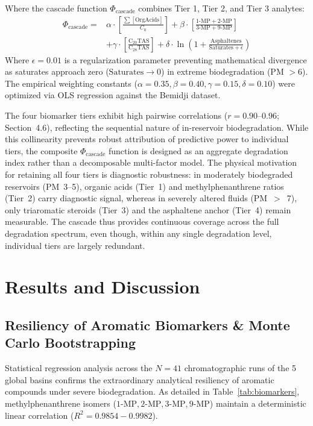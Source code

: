 \documentclass[review,12pt]{elsarticle}
\begin{document}
Where the cascade function $\Phi_{\text{cascade}}$ combines Tier 1, Tier 2, and Tier 3 analytes:
\begin{equation}
\begin{aligned}
    \Phi_{\text{cascade}} = {} & \alpha \cdot \left[ \frac{\sum [\text{OrgAcids}]}{C_0} \right] + \beta \cdot \left[ \frac{1\text{-MP} + 2\text{-MP}}{3\text{-MP} + 9\text{-MP}} \right] \\
    & + \gamma \cdot \left[ \frac{\text{C}_{20}\text{TAS}}{\text{C}_{28}\text{TAS}} \right] + \delta \cdot \ln \left( 1 + \frac{\text{Asphaltenes}}{\text{Saturates} + \epsilon} \right)
\end{aligned}
\end{equation}
Where $\epsilon = 0.01$ is a regularization parameter preventing mathematical divergence as saturates approach zero ($\text{Saturates} \to 0$) in extreme biodegradation (PM $> 6$). The empirical weighting constants ($\alpha = 0.35, \beta = 0.40, \gamma = 0.15, \delta = 0.10$) were optimized via OLS regression against the Bemidji dataset.

The four biomarker tiers exhibit high pairwise correlations ($r = 0.90$--$0.96$; Section~4.6), reflecting the sequential nature of in-reservoir biodegradation. While this collinearity prevents robust attribution of predictive power to individual tiers, the composite $\Phi_{\text{cascade}}$ function is designed as an aggregate degradation index rather than a decomposable multi-factor model. The physical motivation for retaining all four tiers is diagnostic robustness: in moderately biodegraded reservoirs (PM~3--5), organic acids (Tier~1) and methylphenanthrene ratios (Tier~2) carry diagnostic signal, whereas in severely altered fluids (PM~$>$~7), only triaromatic steroids (Tier~3) and the asphaltene anchor (Tier~4) remain measurable. The cascade thus provides continuous coverage across the full degradation spectrum, even though, within any single degradation level, individual tiers are largely redundant.

\section{Results and Discussion}

\subsection{Resiliency of Aromatic Biomarkers \& Monte Carlo Bootstrapping}
Statistical regression analysis across the $N=41$ chromatographic runs of the 5 global basins confirms the extraordinary analytical resiliency of aromatic compounds under severe biodegradation. As detailed in Table~\ref{tab:biomarkers}, methylphenanthrene isomers ($1\text{-MP}, 2\text{-MP}, 3\text{-MP}, 9\text{-MP}$) maintain a deterministic linear correlation ($R^2 = 0.9854 - 0.9982$). 
\end{document}
